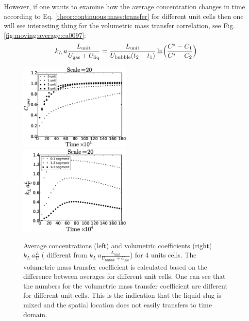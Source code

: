 \documentclass{article}
\newcommand{\beq}{\begin{equation}}
\newcommand{\feq}{\end{equation}}
\newcommand{\vol}{k_L\,a}
\newcommand{\lunit}{L_{\mathrm{unit}}}
\newcommand{\ububble}{U_{\mathrm{bubble}}}
\newcommand{\uliq}{U_{\mathrm{liq}}}
\newcommand{\ugas}{U_{\mathrm{gas}}}
\newcommand{\volnondim}{\vol \frac{\lunit}{\ububble+\ugas}}
\begin{document}
However, if one wants to examine how the average concentration changes in time according to Eq.
\ref{theor:continuous:mass:transfer} for different unit cells then one will see interesting
thing for the volumetric mass transfer correlation, see Fig. \ref{fig:moving:average:ca0097}:
\beq
\label{moving:average}
\vol\frac{\lunit}{\ugas+\uliq}=\frac{\lunit}{\ububble (t_2
-t_1)}\ln\Bigl(\frac{C^*-C_1}{C^*-C_2}\Bigr)
\feq
\begin{figure}[htb!]
\includegraphics[width=0.5\textwidth]{Figures/aver_units4scale20.eps}\hfill
\includegraphics[width=0.5\textwidth]{Figures/coeff_units4scale20.eps}\\
\caption{Average concentrations (left) and volumetric coefficients (right) $\vol \frac{L}{U}$ (
different from $\volnondim$) for $4$ units cells. The volumetric
mass transfer coefficient is calculated based on the difference between averages for different unit
cells. One can see that the numbers for the volumetric mass transfer coefficient are different for
different unit cells. This is the indication that the liquid slug is mixed and the spatial location
does not easily transfers to time domain. 
\label{fig:unit:4}}
\end{figure}
\end{document}
